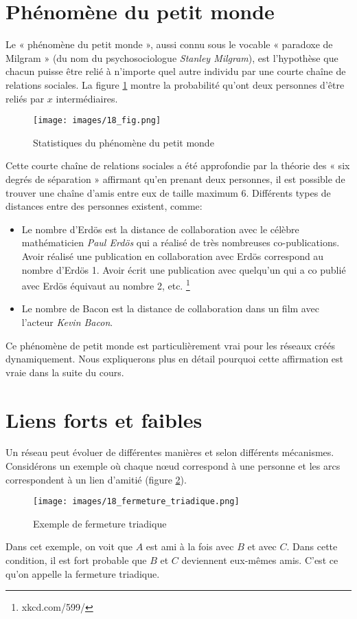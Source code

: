 \section{Phénomène du petit monde}
Le « phénomène du petit monde », aussi connu sous le vocable « paradoxe de Milgram » (du nom du psychosociologue  \textit{Stanley Milgram}), est l'hypothèse que chacun puisse être relié à n'importe quel autre individu par une courte chaîne de relations sociales. La figure \ref{petit_monde} montre la probabilité qu'ont deux personnes d'être reliés par $x$ intermédiaires. 
	\begin{figure}
	\center
	\texttt{[image: images/18\_fig.png]}
	\caption{\label{petit_monde} Statistiques du phénomène du petit monde}
	\end{figure}
Cette  courte chaîne de relations sociales a été approfondie par la théorie des « six degrés de séparation » affirmant qu'en prenant deux personnes, il est possible de trouver une chaîne d'amis entre eux de taille maximum 6.
Différents types de distances entre des personnes existent, comme:
	\begin{itemize}
	\item Le nombre d'Erdös est la distance de collaboration avec le célèbre mathématicien  \textit{Paul Erdös} qui a réalisé de très nombreuses co-publications. Avoir réalisé une publication en collaboration avec Erdös correspond au nombre d'Erdös 1. Avoir écrit une publication avec quelqu'un qui a co publié avec Erdös équivaut au nombre 2, etc. \footnote{xkcd.com/599/}
	\item Le nombre de Bacon est la distance de collaboration dans un film avec l'acteur  \textit{Kevin Bacon}.
	\end{itemize}
Ce phénomène de petit monde est particulièrement vrai pour les réseaux créés dynamiquement. Nous expliquerons plus en détail pourquoi cette affirmation est vraie dans la suite du cours.

\section{Liens forts et faibles}

Un réseau peut évoluer de différentes manières et selon différents mécanismes.
Considérons un exemple où chaque n\oe ud correspond à une personne et les arcs correspondent à un lien d'amitié (figure \ref{fermeture_triadique}).
	\begin{figure}[!h]
	\center
	\texttt{[image: images/18\_fermeture\_triadique.png]}
	\caption{\label{fermeture_triadique} Exemple de fermeture triadique}
	\end{figure}
Dans cet exemple, on voit que $A$ est ami à la fois avec $B$ et avec $C$. Dans cette condition, il est fort probable que $B$ et $C$ deviennent eux-mêmes amis. C'est ce qu'on appelle la fermeture triadique.

